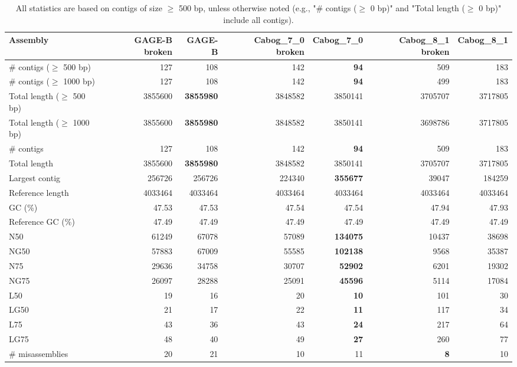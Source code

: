 \documentclass[12pt,a4paper]{article}
\begin{document}
\begin{table}[ht]
\begin{center}
\caption{All statistics are based on contigs of size $\geq$ 500 bp, unless otherwise noted (e.g., "\# contigs ($\geq$ 0 bp)" and "Total length ($\geq$ 0 bp)" include all contigs).}
\begin{tabular}{|l*{6}{|r}|}
\hline
Assembly & GAGE-B broken & GAGE-B & Cabog\_7\_0 broken & Cabog\_7\_0 & Cabog\_8\_1 broken & Cabog\_8\_1 \\ \hline
\# contigs ($\geq$ 500 bp) & 127 & 108 & 142 & {\bf 94} & 509 & 183 \\ \hline
\# contigs ($\geq$ 1000 bp) & 127 & 108 & 142 & {\bf 94} & 499 & 183 \\ \hline
Total length ($\geq$ 500 bp) & 3855600 & {\bf 3855980} & 3848582 & 3850141 & 3705707 & 3717805 \\ \hline
Total length ($\geq$ 1000 bp) & 3855600 & {\bf 3855980} & 3848582 & 3850141 & 3698786 & 3717805 \\ \hline
\# contigs & 127 & 108 & 142 & {\bf 94} & 509 & 183 \\ \hline
Total length & 3855600 & {\bf 3855980} & 3848582 & 3850141 & 3705707 & 3717805 \\ \hline
Largest contig & 256726 & 256726 & 224340 & {\bf 355677} & 39047 & 184259 \\ \hline
Reference length & 4033464 & 4033464 & 4033464 & 4033464 & 4033464 & 4033464 \\ \hline
GC (\%) & 47.53 & 47.53 & 47.54 & 47.54 & 47.94 & 47.93 \\ \hline
Reference GC (\%) & 47.49 & 47.49 & 47.49 & 47.49 & 47.49 & 47.49 \\ \hline
N50 & 61249 & 67078 & 57089 & {\bf 134075} & 10437 & 38698 \\ \hline
NG50 & 57883 & 67009 & 55585 & {\bf 102138} & 9568 & 35387 \\ \hline
N75 & 29636 & 34758 & 30707 & {\bf 52902} & 6201 & 19302 \\ \hline
NG75 & 26097 & 28288 & 25091 & {\bf 45596} & 5114 & 17084 \\ \hline
L50 & 19 & 16 & 20 & {\bf 10} & 101 & 30 \\ \hline
LG50 & 21 & 17 & 22 & {\bf 11} & 117 & 34 \\ \hline
L75 & 43 & 36 & 43 & {\bf 24} & 217 & 64 \\ \hline
LG75 & 48 & 40 & 49 & {\bf 27} & 260 & 77 \\ \hline
\# misassemblies & 20 & 21 & 10 & 11 & {\bf 8} & 10 \\ \hline

\end{tabular}
\end{center}
\end{table}
\end{document}
